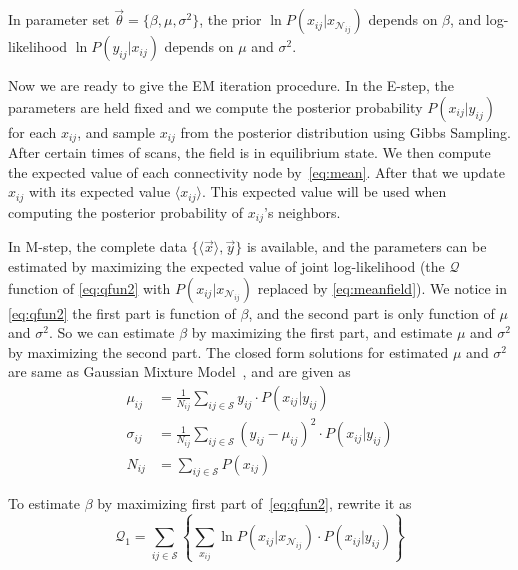 \documentclass[12pt]{article}
\begin{document}
 
In parameter set $\vec \theta = \{ \beta, \mu, \sigma^2\}$, the prior
$\ln P(x_{ij} | x_{\mathcal{N}_{ij}})$ depends on $\beta$, and
log-likelihood $\ln P(y_{ij} | x_{ij})$ depends on $\mu$ and
$\sigma^2$. 

Now we are ready to give the EM iteration procedure. In the E-step,
the parameters are held fixed and we compute the posterior probability
$P(x_{ij} | y_{ij})$ for each $x_{ij}$, and sample $x_{ij}$ from the
posterior distribution using Gibbs Sampling. After certain times of
scans, the field is in equilibrium state. We then compute the expected
value of each connectivity node by~\eqref{eq:mean}. After that we
update $x_{ij}$ with its expected value $\langle x_{ij} \rangle$. This
expected value will be used when computing the posterior probability
of $x_{ij}$'s neighbors.
  
In M-step, the complete data $\{\langle\vec x\rangle, \vec y\}$ is
available, and the parameters can be estimated by maximizing the
expected value of joint log-likelihood (the $\mathcal{Q}$ function of
\eqref{eq:qfun2} with $P(x_{ij} | x_{\mathcal{N}_{ij}})$ replaced by
\eqref{eq:meanfield}). We notice in \eqref{eq:qfun2} the first part is
function of $\beta$, and the second part is only function of $\mu$ and
$\sigma^2$. So we can estimate $\beta$ by maximizing the first part,
and estimate $\mu$ and $\sigma^2$ by maximizing the second part. The
closed form solutions for estimated $\mu$ and $\sigma^2$ are same as
Gaussian Mixture Model~\citep[ch 9]{bishop2006pattern}, and are given as
\begin{align}
  \mu_{ij} &= \frac{1}{N_{ij}} \sum_{ij \in \mathcal{S}} y_{ij} \cdot P(x_{ij} | y_{ij}) \label{eq:getmu}\\
  \sigma_{ij} &= \frac{1}{N_{ij}} \sum_{ij \in \mathcal{S}} (y_{ij} - \mu_{ij})^2 \cdot P(x_{ij} | y_{ij}) \label{eq:getsigma}\\
      N_{ij} &= \sum_{ij \in \mathcal{S}} P(x_{ij}) \label{eq:getN}
\end{align}

To estimate $\beta$ by maximizing first part of~\eqref{eq:qfun2}, rewrite it as 
\begin{equation}
  \mathcal{Q}_1 = \sum_{ij\in \mathcal{S}} \left \{ \sum_{x_{ij}} \ln P(x_{ij} | x_{\mathcal{N}_{ij}}) \cdot P(x_{ij} | y_{ij}) \right \} \label{eq:qfun21}
\end{equation}
\end{document}
